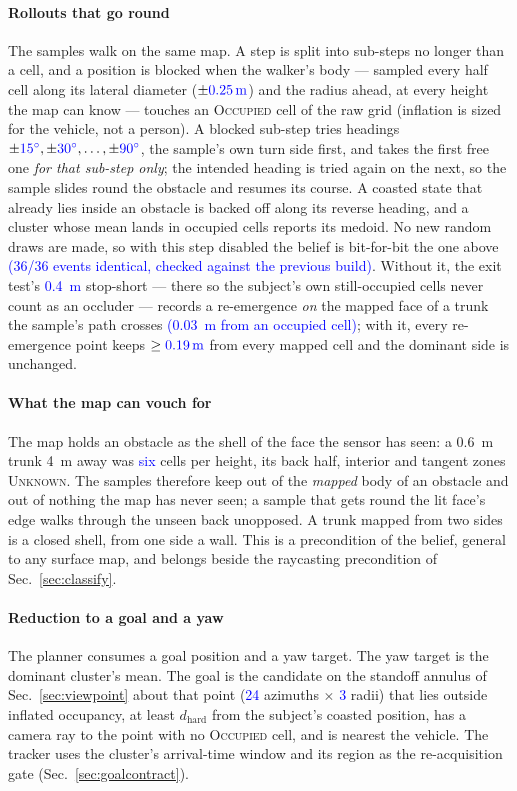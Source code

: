 \documentclass[conference]{IEEEtran}
\newcommand{\bench}[1]{\textcolor{blue}{#1}}
\begin{document}
\paragraph{Rollouts that go round} The samples walk on the same map. A step is
split into sub-steps no longer than a cell, and a position is blocked when the
walker's body --- sampled every half cell along its lateral diameter
($\pm\bench{\SI{0.25}{\meter}}$) and the radius ahead, at every height the map can
know --- touches an \textsc{Occupied} cell of the raw grid (inflation is sized for
the vehicle, not a person). A blocked sub-step tries headings
$\pm\bench{15^\circ}, \pm\bench{30^\circ}, \ldots, \pm\bench{90^\circ}$, the sample's own turn
side first, and takes the first free one \emph{for that sub-step only}; the
intended heading is tried again on the next, so the sample slides round the
obstacle and resumes its course. A coasted state that already lies inside an
obstacle is backed off along its reverse heading, and a cluster whose mean lands
in occupied cells reports its medoid. No new random draws are made, so with this
step disabled the belief is bit-for-bit the one above \bench{(36/36 events
identical, checked against the previous build)}. Without it, the exit test's
\bench{\SI{0.4}{\meter}} stop-short --- there so the subject's own still-occupied cells
never count as an occluder --- records a re-emergence \emph{on} the mapped face of a
trunk the sample's path crosses \bench{(\SI{0.03}{\meter} from an occupied cell)}; with
it, every re-emergence point keeps $\geq\bench{\SI{0.19}{\meter}}$ from every mapped cell
and the dominant side is unchanged.

\paragraph{What the map can vouch for} The map holds an obstacle as the shell of
the face the sensor has seen: a \SI{0.6}{\meter} trunk \SI{4}{\meter} away was
\bench{six} cells per height, its back half, interior and tangent zones
\textsc{Unknown}. The samples therefore keep out of the \emph{mapped} body of an
obstacle and out of nothing the map has never seen; a sample that gets round the
lit face's edge walks through the unseen back unopposed. A trunk mapped from two
sides is a closed shell, from one side a wall. This is a precondition of the
belief, general to any surface map, and belongs beside the raycasting
precondition of Sec.~\ref{sec:classify}.

\paragraph{Reduction to a goal and a yaw} The planner consumes a goal position
and a yaw target. The yaw target is the dominant cluster's mean. The goal is the
candidate on the standoff annulus of Sec.~\ref{sec:viewpoint} about that point
(\bench{24} azimuths $\times$ \bench{3} radii) that lies outside inflated occupancy, at least
$d_{\text{hard}}$ from the subject's coasted position, has a camera ray to the point
with no \textsc{Occupied} cell, and is nearest the vehicle. The tracker uses the
cluster's arrival-time window and its region as the re-acquisition gate
(Sec.~\ref{sec:goalcontract}).
\end{document}
